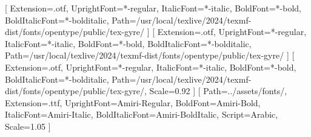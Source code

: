 \usepackage{fontspec}
\usepackage{microtype}
\usepackage{graphicx}
\graphicspath{{../}{../assets/}{../assets/diagrams/}{../assets/logo/}{../assets/fonts/}}
\usepackage{booktabs}
\usepackage{longtable}
\usepackage{tabularx}
\usepackage{array}
\usepackage{calc}
\usepackage{float}
\usepackage{caption}
\usepackage{subcaption}
\usepackage{xcolor}
\usepackage{hyperref}
\usepackage{setspace}
\usepackage{enumitem}
\usepackage{geometry}
\usepackage{scrlayer-scrpage}

\providecommand{\real}[1]{#1}
\providecommand{\tightlist}{\setlength{\itemsep}{0pt}\setlength{\parskip}{0pt}}

\geometry{margin=1.15in, top=1.2in, bottom=1.2in}


\newcommand{\GyrePath}{/usr/local/texlive/2024/texmf-dist/fonts/opentype/public/tex-gyre/}
\setmainfont{TeXGyrePagella}[
  Extension=.otf,
  UprightFont=*-regular,
  ItalicFont=*-italic,
  BoldFont=*-bold,
  BoldItalicFont=*-bolditalic,
  Path=\GyrePath
]
\setsansfont{TeXGyrePagella}[
  Extension=.otf,
  UprightFont=*-regular,
  ItalicFont=*-italic,
  BoldFont=*-bold,
  BoldItalicFont=*-bolditalic,
  Path=\GyrePath
]
\setmonofont{TeXGyreCursor}[
  Extension=.otf,
  UprightFont=*-regular,
  ItalicFont=*-italic,
  BoldFont=*-bold,
  BoldItalicFont=*-bolditalic,
  Path=\GyrePath,
  Scale=0.92
]
\newfontfamily{}[
  Path=../assets/fonts/,
  Extension=.ttf,
  UprightFont=Amiri-Regular,
  BoldFont=Amiri-Bold,
  ItalicFont=Amiri-Italic,
  BoldItalicFont=Amiri-BoldItalic,
  Script=Arabic,
  Scale=1.05
]

\usepackage{ucharclasses}

\let\icbold\textbf
\let\icemph\emph
\let\ictt\texttt
\renewcommand{\textbf}[1]{\textcolor{termcolor}{\icbold{#1}}}
\renewcommand{\emph}[1]{\textcolor{emphcolor}{\icemph{#1}}}
\renewcommand{\texttt}[1]{\textcolor{codecolor}{\fontsize{8.5}{10}\selectfont\icbold{#1}}}

